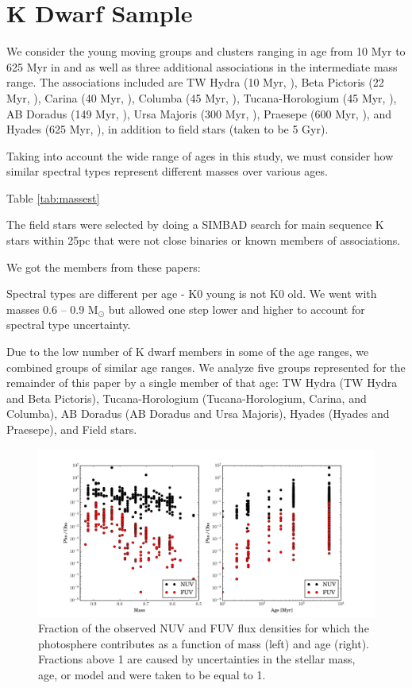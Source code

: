 \documentclass[twocolumn]{aastex62}
\begin{document}
\section{K Dwarf Sample}\label{sec:sample}





We consider the young moving groups and clusters ranging in age from 10 Myr to 625 Myr in \citet{Shkolnik2014} and \citet{Schneider2018} as well as three additional associations in the intermediate mass range. The associations included are TW Hydra (10 Myr, \citealt{Bell2015}), Beta Pictoris (22 Myr, \citealt{Shkolnik2017}), Carina (40 Myr, \citealt{Torres2008}), Columba (45 Myr, \citealt{Zuckerman2011}), Tucana-Horologium (45 Myr, \citealt{Bell2015}), AB Doradus (149 Myr, \citealt{Bell2015}), Ursa Majoris (300 Myr, \citealt{King2005}), Praesepe (600 Myr, \citealt{Kraus2007}), and Hyades (625 Myr, \citealt{Perryman1997}), in addition to field stars (taken to be 5 Gyr).

Taking into account the wide range of ages in this study, we must consider how similar spectral types represent different masses over various ages. 

Table \ref{tab:massest}


The field stars were selected by doing a SIMBAD search for main sequence K stars within 25pc that were not close binaries or known members of associations. 




We got the members from these papers:

Spectral types are different per age - K0 young is not K0 old. We went with masses 0.6 -- 0.9 M$_{\odot}$ but allowed one step lower and higher to account for spectral type uncertainty.


Due to the low number of K dwarf members in some of the age ranges, we combined groups of similar age ranges. We analyze five groups represented for the remainder of this paper by a single member of that age: TW Hydra (TW Hydra and Beta Pictoris), Tucana-Horologium (Tucana-Horologium, Carina, and Columba), AB Doradus (AB Doradus and Ursa Majoris), Hyades (Hyades and Praesepe), and Field stars. 

\begin{figure}[t]
\centering
\includegraphics[width=0.9\linewidth]{phot_obs.pdf}
\caption{Fraction of the observed NUV and FUV flux densities for which the photosphere contributes as a function of mass (left) and age (right). Fractions above 1 are caused by uncertainties in the stellar mass, age, or model and were taken to be equal to 1. \label{fig:phot_obs}}
\end{figure}
\end{document}
